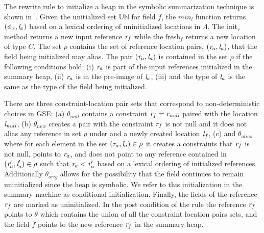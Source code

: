 
The rewrite rule to initialize a heap in the symbolic summarization
technique is shown in~. Given the unitialized set
$\mathbb{UN}$ for field $f$, the $\mathit{min}_l$ function returns
$(\phi_x, \emph{l}_x)$ based on a lexical ordering of uninitialized locations
in $\Lambda$. The init$_r$ method returns a new input reference $\emph{r}_f$
while the fresh$_f$ returns a new location of type $C$. The set $\rho$
contains the set of reference location pairs, $(\emph{r}_a, \emph{l}_a)$, that the
field being initialized may alias. The pair $(\emph{r}_a, \emph{l}_a)$ is contained
in the set $ \rho $ if the following conditions hold: (i) $\emph{r}_a$ is
part of the input references initialized in the summary heap, (ii)
$\emph{r}_a$ is in the pre-image of $\emph{l}_a$, (iii) and the type of $\emph{l}_a$ is the
same as the type of the field being initialized.

There are three constraint-location pair sets that correspond to
non-deterministic choices in GSE: (a) $\theta_\mathit{null}$ contains
a constraint $\emph{r}_f = \emph{r}_\mathit{null}$ paired with the location
$\emph{l}_\mathit{null}$, (b) $\theta_\mathit{new}$ creates a pair with the
constraint $\emph{r}_f$ is not null and it does not alias any reference in
set $\rho$ under and a newly created location $\emph{l}_f$, (c) and
$\theta_\mathit{alias}$ where for each element in the set $(\emph{r}_a, \emph{l}_a)
\in \rho$ it creates a constraints that $\emph{r}_f$ is not null, points to
$\emph{r}_a$, and does not point to any reference contained in $(\emph{r}_a^\prime,
\emph{l}_a^\prime) \in \rho$ such that $\emph{r}_a < \emph{r}_a^\prime$ based on a lexical
ordering of initialized references. Additionally
$\theta_\mathit{orig}$ allows for the possibility that the field
continues to remain uninitialized since the heap is symbolic. We refer
to this initialization in the summary machine as conditional
initialization. Finally, the fields of the reference $\emph{r}_f$ are marked
as uninitialized. In the post condition of the rule the reference
$\emph{r}_f$ points to $\theta$ which contains the union of all the
constraint location pairs sets, and the field $f$ points to the new
reference $\emph{r}_f$ in the summary heap.

\begin{comment}
 Note that the summarize rule invoked repeatedly until
the set of unitialized constraint location pairs for field $f$ is
empty. In other words the set $\Lambda$ is empty. This consititutes
the summarize end rule in~\figref{fig:symInit}.
\end{comment}


